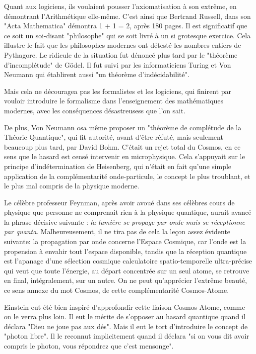 \documentclass[a4paper,12pt]{article}
\begin{document}
Quant aux logiciens, ils voulaient pousser l'axiomatisation à son extrême, en démontrant l'Arithmétique elle-même. C'est ainsi que Bertrand Russell, dans son "Acta Mathematica" démontra 1 + 1 = 2, après 180 pages. Il est significatif que ce soit un soi-disant "philosophe" qui se soit livré à un si grotesque exercice. Cela illustre le fait que les philosophes modernes ont détesté les nombres entiers de Pythagore. Le ridicule de la situation fut dénoncé plus tard par le "théorème d'incomplétude" de Gödel. Il fut suivi par les informaticiens Turing et Von Neumann qui établirent aussi "un théorème d'indécidabilité". 

Mais cela ne découragea pas les formalistes et les logiciens, qui finirent par vouloir introduire le formalisme dans l'enseignement des mathématiques modernes, avec les conséquences désastreusess que l'on sait. 

De plus, Von Neumann osa même proposer un "théorème de complétude de la Théorie Quantique", qui fit autorité, avant d'être réfuté, mais seulement beaucoup plus tard, par David Bohm. C'était un rejet total du Cosmos, en ce sens que le hasard est censé intervenir en microphysique. Cela s'appuyait sur le principe d'indétermination de Heisenberg, qui n'était en fait qu'une simple application de la complémentarité onde-particule, le concept le plus troublant, et le plus mal compris de la physique moderne.

Le célèbre professeur Feynman, après avoir avoué dans ses célèbres cours de physique que personne ne comprenait rien à la physique quantique, aurait avancé la phrase décisive suivante : \textit{la lumière se propage par onde mais se réceptionne par quanta}. Malheureusement, il ne tira pas de cela la leçon assez évidente suivante: la propagation par onde concerne l'Espace Cosmique, car l'onde est la propension à envahir tout l'espace disponible, tandis que la réception quantique est l'apanage d'une sélection cosmique calculatoire spatio-temporelle ultra-précise qui veut que toute l'énergie, au départ concentrée sur un seul atome, se retrouve en final, intégralement, sur un autre. On ne peut qu'apprécier l'extrême beauté, ce sens annexe du mot Cosmos, de cette complémentarité Cosmos-Atome. 

Einstein eut été bien inspiré d'approfondir cette liaison Cosmos-Atome, comme on le verra plus loin. Il eut le mérite de s'opposer au hasard quantique quand il déclara "Dieu ne joue pas aux dés". Mais il eut le tort d'introduire le concept de "photon libre". Il le reconnut implicitement quand il déclara "si on vous dit avoir compris le photon, vous répondrez que c'est mensonge".
\end{document}
